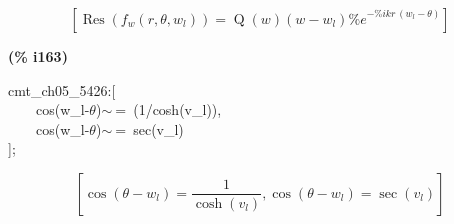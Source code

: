\documentclass[fleqn]{article}
\begin{document}
\[\tag{\% o162} 
\left[ \operatorname{Res}\left( {f_w}\left( r\operatorname{,}\theta \operatorname{,}{w_l}\right) \right) =\operatorname{Q}(w) \left( w-{w_l}\right)  {{\% e}^{-\% i k r\, \left( {w_l}-\theta \right) }}\right] \mbox{}
\]


\noindent
\begin{minipage}[t]{4.000000em}\color{red}\bfseries
(\% i163)	
\end{minipage}
\begin{minipage}[t]{\textwidth}\color{blue}
cmt\_ch05\_5426:[\\
\ \ \ \ cos(w\_l-\ensuremath{\theta})\ensuremath{\sim\ }=\ (1/cosh(v\_l)),\\
\ \ \ \ cos(w\_l-\ensuremath{\theta})\ensuremath{\sim\ }=\ sec(v\_l)\\
];
\end{minipage}
\[\displaystyle \tag{\% o163} 
\left[ \cos{\left( \theta -{w_l}\right) }=\frac{1}{\cosh{\left( {v_l}\right) }}\operatorname{,}\cos{\left( \theta -{w_l}\right) }=\sec{\left( {v_l}\right) }\right] \mbox{}
\]
\end{document}
